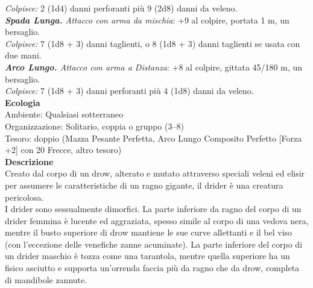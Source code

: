\begin{multicols}{2}
\emph{Colpisce:} 2 (1d4) danni perforanti più 9 (2d8) danni da veleno.\\
\emph{\textbf{Spada Lunga.} Attacco con arma da mischia}: +9 al colpire, portata 1 m, un bersaglio.\\
\emph{Colpisce:} 7 (1d8 + 3) danni taglienti, o 8 (1d8 + 3) danni taglienti se usata con due mani.\\
\emph{\textbf{Arco Lungo.} Attacco con arma a Distanza}: +8 al colpire, gittata 45/180 m, un bersaglio.\\
\emph{Colpisce:} 7 (1d8 + 3) danni perforanti più 4 (1d8) danni da veleno.\\
\textbf{Ecologia}\\
Ambiente: Qualsiasi sotterraneo\\
Organizzazione: Solitario, coppia o gruppo (3–8)\\
Tesoro: doppio (Mazza Pesante Perfetta, Arco Lungo Composito Perfetto [Forza +2] con 20 Frecce, altro tesoro)\\
\textbf{Descrizione}\\
Creato dal corpo di un drow, alterato e mutato attraverso speciali veleni ed elisir per assumere le caratteristiche di un ragno gigante, il drider è una creatura pericolosa.\\
I drider sono sessualmente dimorfici. La parte inferiore da ragno del corpo di un drider femmina è lucente ed aggraziata, spesso simile al corpo di una vedova nera, mentre il busto superiore di drow mantiene le sue curve allettanti e il bel viso (con l'eccezione delle venefiche zanne acuminate). La parte inferiore del corpo di un drider maschio è tozza come una tarantola, mentre quella superiore ha un fisico asciutto e supporta un'orrenda faccia più da ragno che da drow, completa di mandibole zannute.\\


\end{multicols}
